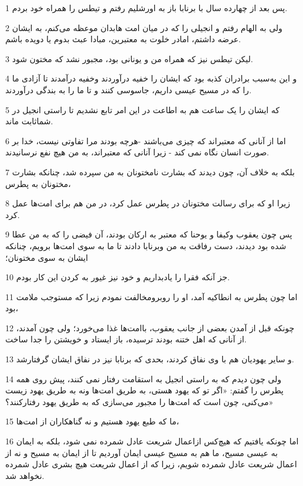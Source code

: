\par 1 پس بعد از چهارده سال با برنابا باز به اورشلیم رفتم و تیطس را همراه خود بردم.
\par 2 ولی به الهام رفتم و انجیلی را که در میان امت هابدان موعظه می‌کنم، به ایشان عرضه داشتم، امادر خلوت به معتبرین، مبادا عبث بدوم یا دویده باشم.
\par 3 لیکن تیطس نیز که همراه من و یونانی بود، مجبور نشد که مختون شود.
\par 4 و این به‌سبب برادران کذبه بود که ایشان را خفیه درآوردند وخفیه درآمدند تا آزادی ما را که در مسیح عیسی داریم، جاسوسی کنند و تا ما را به بندگی درآوردند.
\par 5 که ایشان را یک ساعت هم به اطاعت در این امر تابع نشدیم تا راستی انجیل در شماثابت ماند.
\par 6 اما از آنانی که معتبراند که چیزی می‌باشند -هرچه بودند مرا تفاوتی نیست، خدا بر صورت انسان نگاه نمی کند - زیرا آنانی که معتبراند، به من هیچ نفع نرسانیدند.
\par 7 بلکه به خلاف آن، چون دیدند که بشارت نامختونان به من سپرده شد، چنانکه بشارت مختونان به پطرس،
\par 8 زیرا او که برای رسالت مختونان در پطرس عمل کرد، در من هم برای امت‌ها عمل کرد.
\par 9 پس چون یعقوب وکیفا و یوحنا که معتبر به ارکان بودند، آن فیضی را که به من عطا شده بود دیدند، دست رفاقت به من وبرنابا دادند تا ما به سوی امت‌ها برویم، چنانکه ایشان به سوی مختونان؛
\par 10 جز آنکه فقرا را یادبداریم و خود نیز غیور به کردن این کار بودم.
\par 11 اما چون پطرس به انطاکیه آمد، او را روبرومخالفت نمودم زیرا که مستوجب ملامت بود،
\par 12 چونکه قبل از آمدن بعضی از جانب یعقوب، باامت‌ها غذا می‌خورد؛ ولی چون آمدند، از آنانی که اهل ختنه بودند ترسیده، باز ایستاد و خویشتن را جدا ساخت.
\par 13 و سایر یهودیان هم با وی نفاق کردند، بحدی که برنابا نیز در نفاق ایشان گرفتارشد.
\par 14 ولی چون دیدم که به راستی انجیل به استقامت رفتار نمی کنند، پیش روی همه پطرس را گفتم: «اگر تو که یهود هستی، به طریق امت‌ها ونه به طریق یهود زیست می‌کنی، چون است که امت‌ها را مجبور می‌سازی که به طریق یهود رفتارکنند؟»
\par 15 ما که طبع یهود هستیم و نه گناهکاران از امت‌ها،
\par 16 اما چونکه یافتیم که هیچ‌کس ازاعمال شریعت عادل شمرده نمی شود، بلکه به ایمان به عیسی مسیح، ما هم به مسیح عیسی ایمان آوردیم تا از ایمان به مسیح و نه از اعمال شریعت عادل شمرده شویم، زیرا که از اعمال شریعت هیچ بشری عادل شمرده نخواهد شد.

